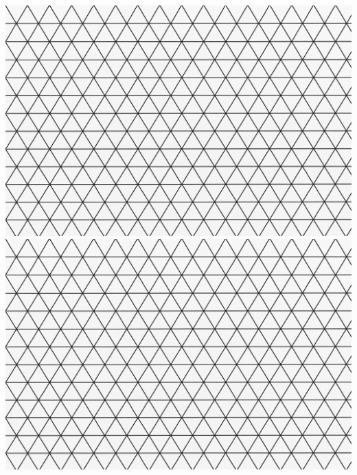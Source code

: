 \documentclass[12pt, a4paper, notitlepage]{extreport}
\begin{document}
\begin{center}
    \includegraphics[scale=0.5]{../png/triangular_grid.png}
    \includegraphics[scale=0.5]{../png/triangular_grid.png}
    \end{center}
\end{document}
